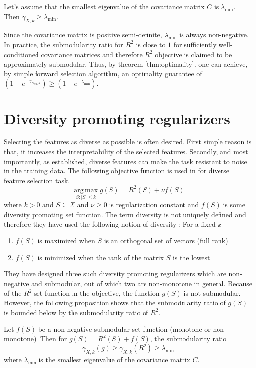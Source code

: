 \begin{lemma}
 Let's assume that the smallest eigenvalue of the covariance matrix $C$ is $\lambda_{\min}$. Then $\gamma_{X,k}\ge \lambda_{\min}$.
\end{lemma}

\noindent Since the covariance matrix is positive semi-definite, $\lambda_{\min}$ is always non-negative. In practice, the submodularity ratio for $R^2$ is close to $1$ for sufficiently well-conditioned covariance matrices and therefore $R^2$ objective is claimed to be approximately submodular. Thus, by theorem \ref{thm:optimality}, one can achieve, by simple forward selection algorithm, an optimality guarantee of $(1-e^{-\gamma_{S_{\text{FR}},k}})\ge(1-e^{-\lambda_{\min}})$.

\section{Diversity promoting regularizers}
\label{section:diversity}
Selecting the features as diverse as possible is often desired. First simple reason is that, it increases the interpretability of the selected features. Secondly, and most importantly, as \citealp{NIPS2012_4689} established, diverse features can make the task resistant to noise in the training data. The following objective function is used in \citealp{NIPS2012_4689} for diverse feature selection task.
\[
 \operatorname*{arg\,max}_{S:|S|\le k} g(S) = R^2(S) + \nu f(S)
\]
where $k>0$ and $S\subseteq X$ and $\nu\ge 0$ is regularization constant and $f(S)$ is some diversity promoting set function. The term diversity is not uniquely defined and therefore they have used the following notion of diversity : For a fixed $k$
\begin{enumerate}
 \item $f(S)$ is maximized when $S$ is an orthogonal set of vectors (full rank)
 \item $f(S)$ is minimized when the rank of the matrix $S$ is the lowest
\end{enumerate}

\noindent They have designed three such diversity promoting regularizers which are non-negative and submodular, out of which two are non-monotone in general. Because of the $R^2$ set function in the objective, the function $g(S)$ is not submodular. However, the following proposition shows that the submodularity ratio of $g(S)$ is bounded below by the submodularity ratio of $R^2$.

\begin{lemma}
 Let $f(S)$ be a non-negative submodular set function (monotone or non-monotone). Then for $g(S)=R^2(S)+f(S)$, the submodularity ratio 
 \[\gamma_{X,k}(g)\ge \gamma_{X,k}(R^2)\ge \lambda_{\min}\]
 where $\lambda_{\min}$ is the smallest eigenvalue of the covariance matrix $C$.
\end{lemma}

